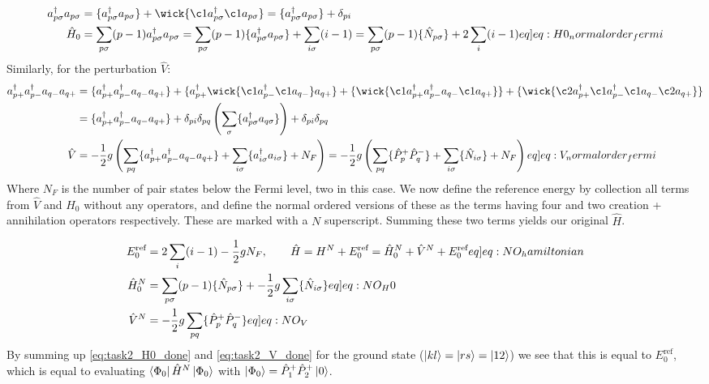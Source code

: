 \documentclass{article}
\newcommand{\crt}[1]{a_{#1}^{\dagger}}
\newcommand{\ani}[1]{a_{#1}}
\newcommand{\inner}[3]{\bra{#1}#2\ket{#3}}
\newcommand{\set}[1]{\{ #1 \}}
\newcommand{\energyref}{E_0^{\text{ref}}}
\newcommand{\pplus}[1]{\hat{P}_{#1}^{+}}
\newcommand{\pminus}[1]{\hat{P}_{#1}^{-}}
\newcommand{\numberop}[1]{\hat{N}_{#1}}
\begin{document}
    \begin{align}
        \crt{p\sigma}\ani{p\sigma} &= \set{\crt{p\sigma}\ani{p\sigma}} + \wick{\c1{a}_{p\sigma}^\dagger \c1{a}_{p\sigma}} = \set{\crt{p\sigma}\ani{p\sigma}} + \delta_{pi} \nonumber \\
        \hat{H}_0 &= \sum_{p\sigma} (p-1) \crt{p\sigma}\ani{p\sigma} = \sum_{p\sigma} (p-1) \set{\crt{p\sigma}\ani{p\sigma}} + \sum_{i\sigma}(i-1) = \sum_{p\sigma}(p-1)\set{\numberop{p\sigma}} + 2\sum_i (i-1) \label[eq]{eq:H0_normalorder_fermi}
    \end{align}
    Similarly, for the perturbation $\hat{V}$:
    \begin{align}
        \crt{p+}\crt{p-}\ani{q-}\ani{q+} &= \set{\crt{p+}\crt{p-}\ani{q-}\ani{q+}} + \set{\crt{p+}\wick{\c1{a}_{p-}^\dagger\c1{a}_{q-}}\ani{q+}} + \set{\wick{\c1{a}_{p+}^\dagger\crt{p-}\ani{q-}\c1{a}_{q+}}} + \set{\wick{\c2{a}_{p+}^\dagger \c1{a}_{p-}^\dagger \c1{a}_{q-} \c2{a}_{q+}}} \nonumber\\
        &=  \set{\crt{p+}\crt{p-}\ani{q-}\ani{q+}} + \delta_{pi}\delta_{pq} \left(\sum_{\sigma} \set{\crt{p\sigma}\ani{q\sigma}}\right) + \delta_{pi}\delta_{pq} \nonumber \\
        \hat{V} &= -\frac{1}{2}g \left( \sum_{pq} \{ \crt{p+}\crt{p-}\ani{q-}\ani{q+}\} + \sum_{i\sigma} \{ \crt{i\sigma} \ani{i\sigma}\} + N_F \right) = -\frac{1}{2}g\left( \sum_{pq} \{ \pplus{p}\pminus{q}\} + \sum_{i\sigma} \{ \numberop{i\sigma} \} + N_F\right) \label[eq]{eq:V_normalorder_fermi}
    \end{align}
    Where $N_F$ is the number of pair states below the Fermi level, two in this case. We now define the reference energy by collection all terms from $\hat{V}$ and $\hat{H}_0$ without any operators, and define the normal ordered versions of these as the terms having four and two creation + annihilation operators respectively. These are marked with a $N$ superscript. Summing these two terms yields our original $\hat{H}$.
    
    \begin{align}
        \energyref &= 2\sum_i (i-1) - \frac{1}{2}gN_F,\hspace{20px}\hat{H} = H^N + \energyref = \hat{H}_{0}^N + \hat{V}^N + \energyref \label[eq]{eq:NO_hamiltonian}\\
        \hat{H}_0^N &= \sum_{p\sigma} (p-1) \set{\hat{N}_{p\sigma}} + -\frac{1}{2}g\sum_{i\sigma} \set{\numberop{i\sigma}} \label[eq]{eq:NO_H0}\\
        \hat{V}^N &= -\frac{1}{2}g \sum_{pq} \set{\pplus{p}\pminus{q}} \label[eq]{eq:NO_V}
    \end{align}
    By summing up \cref{eq:task2_H0_done} and \cref{eq:task2_V_done} for the ground state ($\ket{kl}= \ket{rs} = \ket{12}$) we see that this is equal to $\energyref$, which is equal to evaluating $\inner{\Phi_0}{\hat{H}^N}{\Phi_0}$ with $\ket{\Phi_0} = \pplus{1}\pplus{2}\ket{0}$.
    
\end{document}
